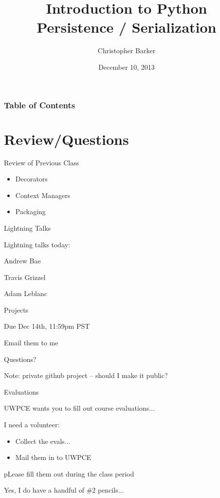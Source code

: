 \documentclass{beamer}
\title[Intro to Python: Week 1]{Introduction  to Python\\
Persistence / Serialization}
\author{Christopher Barker}
\institute{UW Continuing Education}
\date{December 10, 2013}
\begin{document}
\begin{frame}
  \titlepage
\end{frame}

\begin{frame}
\frametitle{Table of Contents}
  \tableofcontents
\end{frame}


\section{Review/Questions}

\begin{frame}{Review of Previous Class}

{\Large
\begin{itemize}
  \item Decorators
  \item Context Managers
  \item Packaging
\end{itemize}
}

\end{frame}


\begin{frame}{Lightning Talks}

\vfill
{\LARGE Lightning talks today:}

\vfill
{\Large
\vfill
Andrew Bae

\vfill
Travis  Grizzel 

\vfill
Adam Leblanc

}
\vfill

\end{frame}


\begin{frame}{Projects}

  \vfill
  {\Large Due Dec 14th, 11:59pm PST }

  \vfill
  {\Large Email them to me}

  \vfill
  {\Large Questions?}

  \vfill
  {\large Note: private github project -- should I make it public?}

\end{frame}

\begin{frame}{Evaluations}

\vfill
{\Large UWPCE wants you to fill out course evaluations...}

\vfill
{\Large I need a volunteer:
\begin{itemize}
  \item Collect the evals...
  \item Mail them in to UWPCE
\end{itemize}
}

\vfill
{\Large pLease fill them out during the class period}

\vfill
{\large Yes, I do have a handful of \#2 pencils...}

\end{frame}
\end{document}
